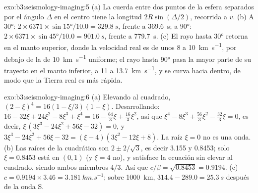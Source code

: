 \begin{solution}{exo:b3:seismology-imaging:5}
(a) La cuerda entre dos puntos de la esfera separados por el ángulo $\Delta$
en el centro tiene la longitud $2R\sin(\Delta/2)$, recorrida a $v$.
(b) A \ang{30}: $2\times6371\times\sin\ang{15}/10.0 = \qty{329.8}{s}$, frente a
\qty{369.6}{s}; a \ang{90}: $2\times6371\times\sin\ang{45}/10.0 =
\qty{901.0}{s}$, frente a \qty{779.7}{s}. (c) El rayo hasta \ang{30} retorna en el
manto superior, donde la velocidad real es de unos 8 a \qty{10}{km.s^{-1}}, por debajo
de la de \qty{10}{km.s^{-1}} uniforme; el rayo hasta \ang{90} pasa la mayor parte de su trayecto en el
manto inferior, a 11 a \qty{13.7}{km.s^{-1}}, y se curva hacia dentro, de modo que la
Tierra real es más rápida.
\end{solution}

\begin{solution}{exo:b3:seismology-imaging:6}
(a) Elevando al cuadrado, $(2 - \xi)^4 = 16(1 - \xi/3)(1 - \xi)$. Desarrollando:
$16 - 32\xi + 24\xi^2 - 8\xi^3 + \xi^4 = 16 - \tfrac{64}{3}\xi + \tfrac{16}{3}\xi^2$,
así que $\xi^4 - 8\xi^3 + \tfrac{56}{3}\xi^2 - \tfrac{32}{3}\xi = 0$, es decir,
$\xi\,(3\xi^3 - 24\xi^2 + 56\xi - 32) = 0$, y
$3\xi^3 - 24\xi^2 + 56\xi - 32 = (\xi - 4)(3\xi^2 - 12\xi + 8)$. La raíz
$\xi = 0$ no es una onda. (b) Las raíces de la cuadrática son $2 \pm 2/\sqrt3$,
es decir 3.155 y 0.8453; solo $\xi = 0.8453$ está en $(0, 1)$ (y $\xi = 4$
no), y satisface la ecuación sin elevar al cuadrado, siendo ambos miembros $4/3$.
Así que $c/\beta = \sqrt{0.8453} = 0.9194$. (c) $c = 0.9194\times3.46 =
\qty{3.181}{km.s^{-1}}$; sobre \qty{1000}{km}, $314.4 - 289.0 = \qty{25.3}{s}$
después de la onda S.
\end{solution}

